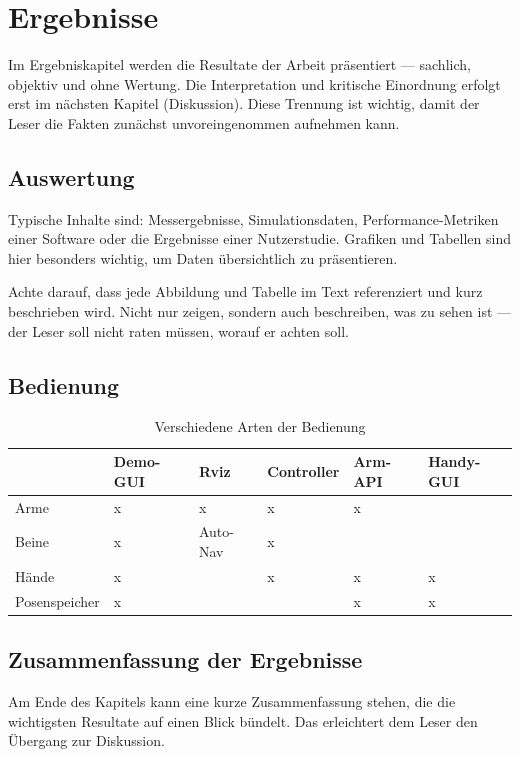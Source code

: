 \chapter{Ergebnisse}

Im Ergebniskapitel werden die Resultate der Arbeit präsentiert — sachlich, objektiv und ohne Wertung. Die Interpretation und kritische Einordnung erfolgt erst im nächsten Kapitel (Diskussion). Diese Trennung ist wichtig, damit der Leser die Fakten zunächst unvoreingenommen aufnehmen kann.

\section{Auswertung}

Typische Inhalte sind: Messergebnisse, Simulationsdaten, Performance-Metriken einer Software oder die Ergebnisse einer Nutzerstudie. Grafiken und Tabellen sind hier besonders wichtig, um Daten übersichtlich zu präsentieren.

Achte darauf, dass jede Abbildung und Tabelle im Text referenziert und kurz beschrieben wird. Nicht nur zeigen, sondern auch beschreiben, was zu sehen ist — der Leser soll nicht raten müssen, worauf er achten soll.

\section{Bedienung}

\begin{table}[htbp]
    \centering
\caption{Verschiedene Arten der Bedienung}
\label{tab:placeholder}
    \begin{tabular}{|l|l|l|l|l|l|}\hline
           &Demo-GUI& Rviz&Controller&  Arm-API &Handy-GUI\\\hline
           Arme&x& x&x& 
     x&\\\hline
 Beine& x& Auto-Nav& x& &\\\hline
 Hände& x& & x& x&x\\\hline
 Posenspeicher& x& & & x&x\\ \hline\end{tabular}
    
    
\end{table}


\section{Zusammenfassung der Ergebnisse}

Am Ende des Kapitels kann eine kurze Zusammenfassung stehen, die die wichtigsten Resultate auf einen Blick bündelt. Das erleichtert dem Leser den Übergang zur Diskussion.
